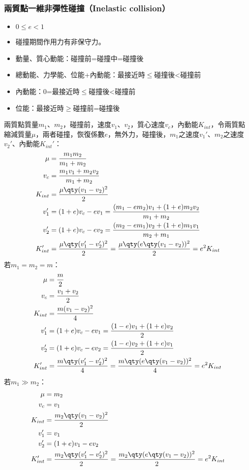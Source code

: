 \documentclass[a4paper,12pt]{article}
\begin{document}
\subsubsection{兩質點一維非彈性碰撞（Inelastic collision）}
\begin{itemize}
\item $0\leq e<1$
\item 碰撞期間作用力有非保守力。
\item 動量、質心動能：碰撞前=碰撞中=碰撞後
\item 總動能、力學能、位能+內動能：最接近時$\leq$碰撞後<碰撞前
\item 內動能：0=最接近時$\leq$碰撞後<碰撞前
\item 位能：最接近時$\geq$碰撞前=碰撞後
\end{itemize}
兩質點質量$m_1$、$m_2$，碰撞前，速度$v_1$、$v_2$，質心速度$v_c$，內動能$K_{int}$，令兩質點縮減質量$\mu$，兩者碰撞，恢復係數$e$，無外力，碰撞後，$m_1$之速度$v_1'$、$m_2$之速度$v_2'$、內動能$K_{int}'$：
\[\begin{aligned}
\mu&=\frac{m_1m_2}{m_1+m_2}\\
v_c &= \frac{m_1v_1+m_2v_2}{m_1+m_2} \\
K_{int} &= \frac{\mu\qty(v_1-v_2)^2}{2}\\
v_1' &= (1+e)v_c - ev_1 = \frac{(m_1-em_2)v_1+(1+e)m_2v_2}{m_1+m_2} \\
v_2' &= (1+e)v_c - ev_2 = \frac{(m_2-em_1)v_2+(1+e)m_1v_1}{m_2+m_1} \\
K_{int}' &= \frac{\mu \qty(v_1'-v_2')^2}{2} = \frac{\mu \qty(e\qty(v_1-v_2))^2}{2} = e^2K_{int}
\end{aligned}\]
若$m_1=m_2=m$：
\[\begin{aligned}
\mu&=\frac{m}{2}\\
v_c &= \frac{v_1+v_2}{2} \\
K_{int} &= \frac{m(v_1-v_2)^2}{4}\\
v_1' &= (1+e)v_c - ev_1 = \frac{(1-e)v_1+(1+e)v_2}{2} \\
v_2' &= (1+e)v_c - ev_2 = \frac{(1-e)v_2+(1+e)v_1}{2} \\
K_{int}' &= \frac{m\qty(v_1'-v_2')^2}{4} = \frac{m\qty(e\qty(v_1-v_2))^2}{4} = e^2K_{int}
\end{aligned}\]
若$m_1\gg m_2$：
\[\begin{aligned}
\mu&=m_2\\
v_c &= v_1 \\
K_{int} &= \frac{m_2\qty(v_1-v_2)^2}{2}\\
v_1' &= v_1 \\
v_2' &= (1+e)v_1 - ev_2 \\
K_{int}' &= \frac{m_2\qty(v_1'-v_2')^2}{2} = \frac{m_2\qty(e\qty(v_1-v_2))^2}{2} = e^2K_{int}
\end{aligned}\]
\end{document}

